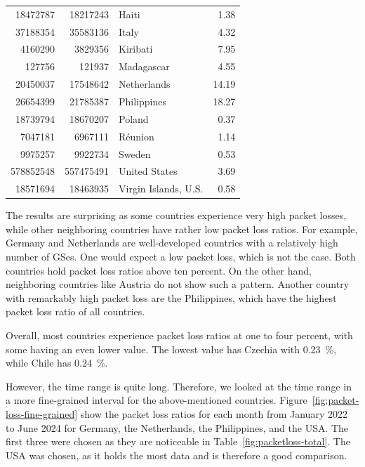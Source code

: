 \begin{table}
\begin{tabular}{rrlr}
		18472787  & 18217243  & Haiti                       & 1.38   \\
		37188354  & 35583136  & Italy                       & 4.32   \\
		4160290   & 3829356   & Kiribati                    & 7.95   \\
		127756    & 121937    & Madagascar                  & 4.55   \\
		20450037  & 17548642  & Netherlands                 & 14.19  \\
		26654399  & 21785387  & Philippines                 & 18.27  \\
		18739794  & 18670207  & Poland                      & 0.37   \\
		7047181   & 6967111   & Réunion                     & 1.14   \\
		9975257   & 9922734   & Sweden                      & 0.53   \\
		578852548 & 557475491 & United States               & 3.69   \\
		18571694  & 18463935  & Virgin Islands, U.S.        & 0.58   \\
		\bottomrule
	\end{tabular}
\end{table}

The results are surprising as some countries experience very high packet
losses, while other neighboring countries have rather low packet loss ratios.
For example, Germany and Netherlands are well-developed countries with a
relatively high number of \ac{GS}es. One would expect a low packet loss, which
is not the case. Both countries hold packet loss ratios above ten percent. On
the other hand, neighboring countries like Austria do not show such a pattern.
Another country with remarkably high packet loss are the Philippines, which
have the highest packet loss ratio of all countries.

Overall, most countries experience packet loss ratios at one to four percent,
with some having an even lower value. The lowest value has Czechia with
0.23~\%, while Chile has 0.24~\%.

However, the time range is quite long. Therefore, we looked at the time range
in a more fine-grained interval for the above-mentioned countries.
Figure~\ref{fig:packet-loss-fine-grained} show the packet loss ratios for each
month from January 2022 to June 2024 for Germany, the Netherlands, the
Philippines, and the USA. The first three were chosen as they are noticeable in
Table~\ref{fig:packetloss-total}. The USA was chosen, as it holds the most data
and is therefore a good comparison.

